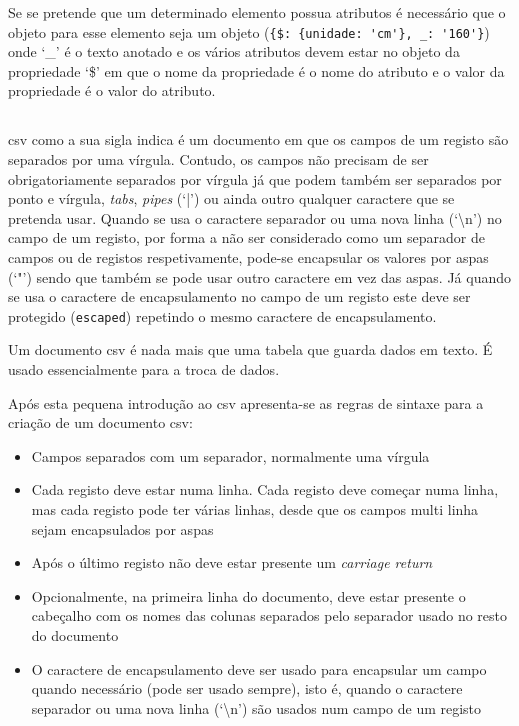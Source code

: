 Se se pretende que um determinado elemento possua atributos é necessário que o objeto para esse elemento seja um objeto (\verb|{$: {unidade: 'cm'}, _: '160'}|) onde `\_' é o texto anotado e os vários atributos devem estar no objeto da propriedade `\$' em que o nome da propriedade é o nome do atributo e o valor da propriedade é o valor do atributo.

\subsection{}

\acrfull{csv} como a sua sigla indica é um documento em que os campos de um registo são separados por uma vírgula. Contudo, os campos não precisam de ser obrigatoriamente separados por vírgula já que podem também ser separados por ponto e vírgula, \textit{tabs}, \textit{pipes} (`|') ou ainda outro qualquer caractere que se pretenda usar. Quando se usa o caractere separador ou uma nova linha (`\backslash{}n') no campo de um registo, por forma a não ser considerado como um separador de campos ou de registos respetivamente, pode-se encapsular os valores por aspas (`"') sendo que também se pode usar outro caractere em vez das aspas. Já quando se usa o caractere de encapsulamento no campo de um registo este deve ser protegido (\texttt{escaped}) repetindo o mesmo caractere de encapsulamento.

Um documento \acrshort{csv} é nada mais que uma tabela que guarda dados em texto. É usado essencialmente para a troca de dados.

Após esta pequena introdução ao \acrshort{csv} apresenta-se as regras de sintaxe para a criação de um documento \acrshort{csv}:
\begin{itemize}
    \item Campos separados com um separador, normalmente uma vírgula
    \item Cada registo deve estar numa linha. Cada registo deve começar numa linha, mas cada registo pode ter várias linhas, desde que os campos multi linha sejam encapsulados por aspas
    \item Após o último registo não deve estar presente um \textit{carriage return}
    \item Opcionalmente, na primeira linha do documento, deve estar presente o cabeçalho com os nomes das colunas separados pelo separador usado no resto do documento
    \item O caractere de encapsulamento deve ser usado para encapsular um campo quando necessário (pode ser usado sempre), isto é, quando o caractere separador ou uma nova linha (`\backslash{}n') são usados num campo de um registo
\end{itemize}


